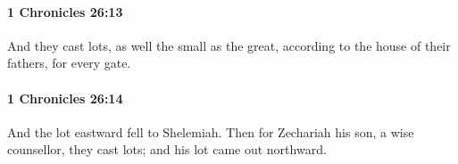 		\paragraph{1 Chronicles 26:13} %
			\label{1CHRONICLES-26-13}

			And they cast lots, as well the small as the great, according to the house of their fathers, for every gate.


		\paragraph{1 Chronicles 26:14} %
			\label{1CHRONICLES-26-14}

			And the lot eastward fell to Shelemiah. Then for Zechariah his son, a wise counsellor, they cast lots; and his lot came out northward.


